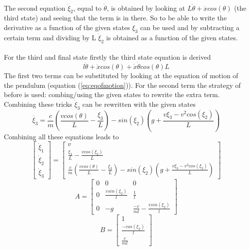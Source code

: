 \\
The second equation $\dot{\xi}_{2}$, equal to $\dot{\theta}$, is obtained by looking at $L\dot{\theta}+\dot{x}cos(\theta)$ (the third state) and seeing that the term is in there. So to be able to write the derivative as a function of the given states $\xi_{3}$ can be used and by subtracting a certain term and dividing by L $\dot{\xi}_{2}$ is obtained as a function of the given states.\\
\\
For the third and final state firstly the third state equation is derived
\begin{equation}
    l\ddot{\theta} + \ddot{x}cos(\theta) + \dot{x}\dot{\theta}cos(\theta)L
\end{equation}
The first two terms can be substituted by looking at the equation of motion of the pendulum (equation (\ref{eq:eqofmotion})). For the second term the strategy of before is used: combing/using the given states to rewrite the extra term. Combining these tricks $\dot{\xi}_{3}$ can be rewritten with the given states
\begin{equation}
    \dot{\xi_{3}} = \frac{c}{m}(\frac{vcos(\theta)}{L}-\frac{\xi_{3}}{L})-sin(\xi_{2})(g+\frac{v\xi_{3}-v^{2}cos(\xi_{2})}{L})
\end{equation}
Combining all these equations leads to
\begin{equation}
    \begin{bmatrix} 
        \dot{\xi}_{1} \\
        \dot{\xi}_{2} \\
        \dot{\xi}_{3}
    \end{bmatrix}
    =
    \begin{bmatrix} 
        v\\
        \frac{\xi_{3}}{L} - \frac{vcos(\xi_{2})}{L} \\
        \frac{c}{m}(\frac{vcos(\theta)}{L}-\frac{\xi_{3}}{L})-sin(\xi_{2})(g+\frac{v\xi_{3}-v^{2}cos(\xi_{2})}{L})
    \end{bmatrix}
\end{equation}
\begin{equation}
    A
    =
    \begin{bmatrix} 
        0& 0& 0 \\
        0& \frac{vsin(\xi_{2})}{l}& \frac{1}{l}\\
        0& -g& \frac{-c}{ml}-\frac{vsin(\xi_{2})}{l}
    \end{bmatrix}
\end{equation}
\begin{equation}
    B
    =
    \begin{bmatrix} 
        1 \\
        \frac{-cos(\xi_{2})}{l}\\
        \frac{c}{ml}
    \end{bmatrix}
\end{equation}





